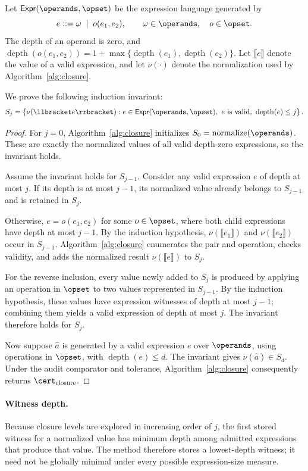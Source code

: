 Let $\mathsf{Expr}(\operands,\opset)$ be the expression language
generated by
\[
e ::= \omega
\;\mid\;
o(e_1,e_2),
\qquad
\omega\in\operands,\quad o\in\opset.
\]
The depth of an operand is zero, and
$\operatorname{depth}(o(e_1,e_2))
=1+\max\{\operatorname{depth}(e_1),
\operatorname{depth}(e_2)\}$. Let
$\llbracket e\rrbracket$ denote the value of a valid expression,
and let $\nu(\cdot)$ denote the normalization used by
Algorithm~\ref{alg:closure}.

We prove the following induction invariant:
\[
S_j
=
\left\{
\nu(\llbracket e\rrbracket):
e\in\mathsf{Expr}(\operands,\opset),\
e\text{ is valid},\
\operatorname{depth}(e)\le j
\right\}.
\]

\begin{proof}
For $j=0$, Algorithm~\ref{alg:closure} initializes
$S_0=\operatorname{normalize}(\operands)$. These are exactly the
normalized values of all valid depth-zero expressions, so the
invariant holds.

Assume the invariant holds for $S_{j-1}$. Consider any valid
expression $e$ of depth at most $j$. If its depth is at most
$j-1$, its normalized value already belongs to $S_{j-1}$ and is
retained in $S_j$.

Otherwise, $e=o(e_1,e_2)$ for some $o\in\opset$, where both child
expressions have depth at most $j-1$. By the induction hypothesis,
$\nu(\llbracket e_1\rrbracket)$ and
$\nu(\llbracket e_2\rrbracket)$ occur in $S_{j-1}$.
Algorithm~\ref{alg:closure} enumerates the pair and operation,
checks validity, and adds the normalized result
$\nu(\llbracket e\rrbracket)$ to $S_j$.

For the reverse inclusion, every value newly added to $S_j$ is
produced by applying an operation in $\opset$ to two values
represented in $S_{j-1}$. By the induction hypothesis, these
values have expression witnesses of depth at most $j-1$; combining
them yields a valid expression of depth at most $j$. The invariant
therefore holds for $S_j$.

Now suppose $\hat a$ is generated by a valid expression $e$ over
$\operands$, using operations in $\opset$, with
$\operatorname{depth}(e)\le d$. The invariant gives
$\nu(\hat a)\in S_d$. Under the audit comparator and tolerance,
Algorithm~\ref{alg:closure} consequently returns
$\cert_{\mathrm{closure}}$.
\end{proof}

\paragraph{Witness depth.}
Because closure levels are explored in increasing order of $j$,
the first stored witness for a normalized value has minimum depth
among admitted expressions that produce that value. The method
therefore stores a lowest-depth witness; it need not be globally
minimal under every possible expression-size measure.

